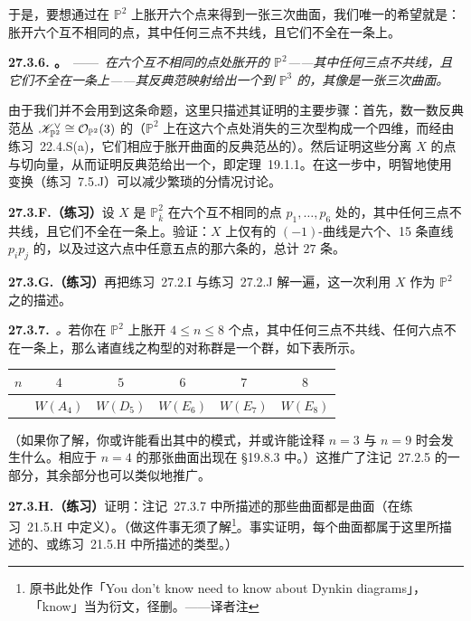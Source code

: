 于是，要想通过在 $\mathbb{P}^2$ 上胀开六个点来得到一张\trSmooth{}三次曲面，我们唯一的希望就是：胀开六个互不相同的点，其中任何三点不共线，且它们不全在一条\trConic{}上。

\textbf{27.3.6. \trhProposition{}。}\ ——\ \emph{在六个互不相同的点处胀开的 $\mathbb{P}^2$——其中任何三点不共线，且它们不全在一条\trConic{}上——其反典范映射给出一个到 $\mathbb{P}^3$ 的\trClosedEmbedding{}，其像是一张三次曲面。}

由于我们并不会用到这条命题，这里只描述其证明的主要步骤：首先，数一数反典范丛 $\mathscr{K}_{\mathbb{P}^2}^{\vee}\cong\mathcal{O}_{\mathbb{P}^2}(3)$ 的\trSection{}（$\mathbb{P}^2$ 上在这六个点处消失的三次型构成一个四维\trVectorSpace{}，而经由\mbox{练习~22.4.S(a)}，它们相应于胀开曲面的反典范丛的\trSection{}）。然后证明这些\trSection{}分离 $X$ 的点与切向量，从而证明反典范\trLinearSystem{}给出一个\trClosedEmbedding{}，即\mbox{定理~19.1.1}。在这一步中，明智地使用\trCremona{}变换（\mbox{练习~7.5.J}）可以减少繁琐的分情况讨论。

\textbf{27.3.F.（练习）}\quad 设 $X$ 是 $\mathbb{P}^2_{\bar{k}}$ 在六个互不相同的点 $p_1,\dots,p_6$ 处的\trBlowup{}，其中任何三点不共线，且它们不全在一条\trConic{}上。验证：$X$ 上仅有的 $(-1)$-曲线是六个\trExceptionalDivisor{}、15 条直线 $p_ip_j$ 的\trProperTransform{}，以及过这六点中任意五点的那六条\trConic{}的\trProperTransform{}，总计 $27$ 条。

\textbf{27.3.G.（练习）}\quad 再把\mbox{练习~27.2.I} 与\mbox{练习~27.2.J} 解一遍，这一次利用 $X$ 作为 $\mathbb{P}^2$ 之\trBlowup{}的描述。

\textbf{27.3.7.}\ \emph{\trhRemark{}。}\quad 若你在 $\mathbb{P}^2$ 上胀开 $4\le n\le 8$ 个点，其中任何三点不共线、任何六点不在一条\trConic{}上，那么诸直线之构型的对称群是一个\trWeyl{}群，如下表所示。

\begin{center}
\begin{tabular}{|c||c|c|c|c|c|}
\hline
$n$ & $4$ & $5$ & $6$ & $7$ & $8$ \\\hline
 & $W(A_4)$ & $W(D_5)$ & $W(E_6)$ & $W(E_7)$ & $W(E_8)$ \\\hline
\end{tabular}
\end{center}

（如果你了解\trDynkinDiagram{}，你或许能看出其中的模式，并或许能诠释 $n=3$ 与 $n=9$ 时会发生什么。相应于 $n=4$ 的那张曲面出现在 \S19.8.3 中。）这推广了\mbox{注记~27.2.5} 的一部分，其余部分也可以类似地推广。

\textbf{27.3.H.（练习）}\quad 证明：\mbox{注记~27.3.7} 中所描述的那些曲面都是\trDelPezzo{}曲面（在\mbox{练习~21.5.H} 中定义）。（做这件事无须了解\trDynkinDiagram\footnote{原书此处作「You don't know need to know about Dynkin diagrams」，「know」当为衍文，径删。——译者注}。事实证明，每个\trDelPezzo{}曲面都属于这里所描述的、或\mbox{练习~21.5.H} 中所描述的类型。）
